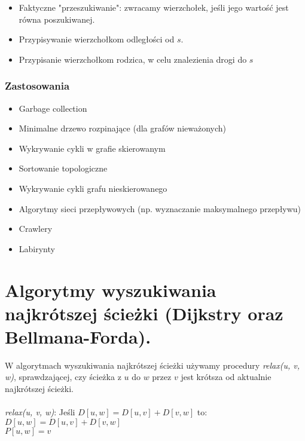 \documentclass[main.tex]{subfiles}
\begin{document}
    \begin{itemize}
        \item Faktyczne "przeszukiwanie": zwracamy wierzchołek, jeśli jego wartość jest
        równa poszukiwanej.
        \item Przypisywanie wierzchołkom odległości od $s$.
        \item Przypisanie wierzchołkom rodzica, w celu znalezienia drogi do $s$
    \end{itemize}

    \subsubsection{Zastosowania}

    \begin{itemize}
        \item Garbage collection
        \item Minimalne drzewo rozpinające (dla grafów nieważonych)
        \item Wykrywanie cykli w grafie skierowanym
        \item Sortowanie topologiczne
        \item Wykrywanie cykli grafu nieskierowanego
        \item Algorytmy sieci przepływowych (np. wyznaczanie maksymalnego przepływu)
        \item Crawlery
        \item Labirynty
    \end{itemize}

    \newpage

    \section{Algorytmy wyszukiwania najkrótszej ścieżki (Dijkstry oraz Bellmana-Forda).}

    W algorytmach wyszukiwania najkrótszej ścieżki używamy procedury \textit{relax(u, v, w)},
    sprawdzającej, czy ścieżka z $u$ do $w$ przez $v$ jest krótsza od aktualnie najkrótszej
    ścieżki.
    \\~\\
    \textit{relax(u, v, w)}:
    \vskip 0pt Jeśli $D[u, w] = D[u, v] + D[v, w]$ to:\\
    \hspace*{1cm} $D[u, w] = D[u, v] + D[v, w]$\\
    \hspace*{1cm} $P[u, w] = v$\\
\end{document}
